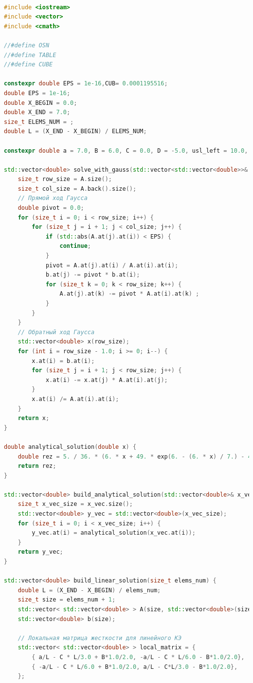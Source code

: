 \begin{lstlisting}[language=c++, label=prog,caption={\textit{Реализация МКЭ}}]

#include <iostream>
#include <vector>
#include <cmath>

//#define OSN 
//#define TABLE
//#define CUBE

constexpr double EPS = 1e-16,CUB= 0.0001195516;
double EPS = 1e-16;
double X_BEGIN = 0.0;
double X_END = 7.0;
size_t ELEMS_NUM = ;
double L = (X_END - X_BEGIN) / ELEMS_NUM;

constexpr double a = 7.0, B = 6.0, C = 0.0, D = -5.0, usl_left = 10.0, usl_right = -5.0; // au"+Bu'+Cu+D=0

std::vector<double> solve_with_gauss(std::vector<std::vector<double>>& A, std::vector<double>& b){
    size_t row_size = A.size();
    size_t col_size = A.back().size();
    // Прямой ход Гаусса
    double pivot = 0.0;
    for (size_t i = 0; i < row_size; i++) {
        for (size_t j = i + 1; j < col_size; j++) {
            if (std::abs(A.at(j).at(i)) < EPS) {
                continue;
            }
            pivot = A.at(j).at(i) / A.at(i).at(i);
            b.at(j) -= pivot * b.at(i);
            for (size_t k = 0; k < row_size; k++) {
                A.at(j).at(k) -= pivot * A.at(i).at(k) ;
            }
        }
    }
    // Обратный ход Гаусса
    std::vector<double> x(row_size);
    for (int i = row_size - 1.0; i >= 0; i--) {
        x.at(i) = b.at(i);
        for (size_t j = i + 1; j < row_size; j++) {
            x.at(i) -= x.at(j) * A.at(i).at(j);
        }
        x.at(i) /= A.at(i).at(i);
    }
    return x;
}

double analytical_solution(double x) {
    double rez = 5. / 36. * (6. * x + 49. * exp(6. - (6. * x) / 7.) - 49. * exp(6.) + 72.);
    return rez;
}

std::vector<double> build_analytical_solution(std::vector<double>& x_vec) {
    size_t x_vec_size = x_vec.size();
    std::vector<double> y_vec = std::vector<double>(x_vec_size);
    for (size_t i = 0; i < x_vec_size; i++) {
        y_vec.at(i) = analytical_solution(x_vec.at(i));
    }
    return y_vec;
}

std::vector<double> build_linear_solution(size_t elems_num) {
    double L = (X_END - X_BEGIN) / elems_num;
    size_t size = elems_num + 1;
    std::vector< std::vector<double> > A(size, std::vector<double>(size));
    std::vector<double> b(size);
    
    // Локальная матрица жесткости для линейного КЭ
    std::vector< std::vector<double> > local_matrix = {
        { a/L - C * L/3.0 + B*1.0/2.0, -a/L - C * L/6.0 - B*1.0/2.0},
        { -a/L - C * L/6.0 + B*1.0/2.0, a/L - C*L/3.0 - B*1.0/2.0},
    };
    

\end{lstlisting}
